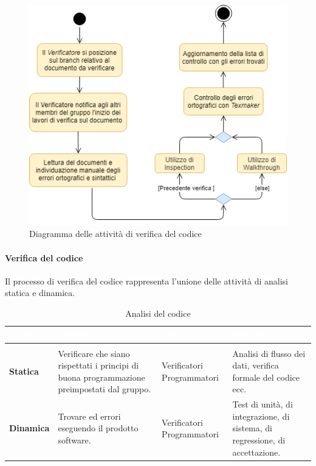 \begin{figure}[!htb]
     \centering
     \includegraphics[scale=0.7]{Images/verDocs.png}
     \caption{Diagramma delle attività di verifica del codice}
\end{figure}



\paragraph{Verifica del codice}
Il processo di verifica del codice rappresenta l'unione delle attività di analisi statica e dinamica. 

\renewcommand{\arraystretch}{1.5}
\renewcommand\extrarowheight{1.5pt}
\begin{longtable}{C{3cm} | C{4cm} C{3cm} C{5cm}}
		\textcolor{white}{\textbf{Analisi}} & 
		\textcolor{white}{\textbf{Obiettivo}} & 
		\textcolor{white}{\textbf{Attori}} & 
		\textcolor{white}{\textbf{Esempi}} \\
		\endfirsthead
		\\
	    \endfoot
	    \caption{Analisi del codice}
	    \endlastfoot
		\hline
		\textbf{Statica} & 
		Verificare che siano rispettati i principi di buona programmazione preimpostati dal gruppo. & 
		Verificatori \newline Programmatori & 
		Analisi di flusso dei dati, verifica formale del codice ecc. \\
		\textbf{Dinamica} & 
		Trovare  ed errori eseguendo il prodotto software.  & 
		Verificatori \newline Programmatori & 
		Test di unità, di integrazione, di sistema, di regressione, di accettazione. \\
\end{longtable}

